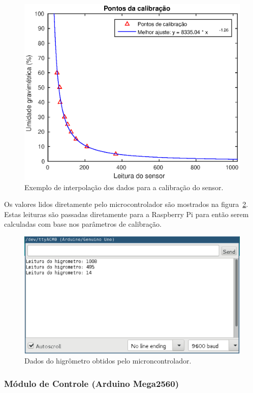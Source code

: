 			\begin{figure}[!htbp]
			\begin{center}
			\includegraphics[width=.7\textwidth]{figuras/calibration.eps}
			\caption{\label{fig:calibration}Exemplo de interpolação dos dados para a calibração do sensor.}
			\end{center}
			\end{figure}

			Os valores lidos diretamente pelo microcontrolador são mostrados na figura~\ref{fig:fc28ardu}.
			Estas leituras são passadas diretamente para a Raspberry Pi para então serem
			calculadas com base nos parâmetros de calibração.

			\begin{figure}[!htbp]
			\begin{center}
			\includegraphics[width=.7\textwidth]{figuras/fc28_arduino.eps}
			\caption{\label{fig:fc28ardu}Dados do higrômetro obtidos pelo microncontrolador.}
			\end{center}
			\end{figure}

  \subsubsection{Módulo de Controle (Arduino Mega2560)}

